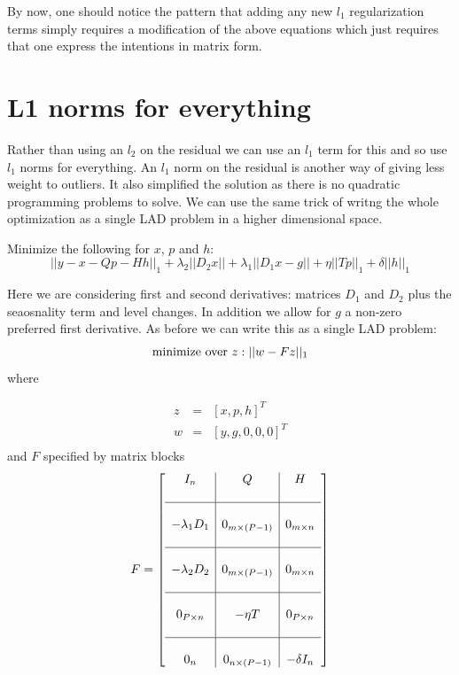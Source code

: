 \documentclass{article}
\begin{document}
By now, one should notice the pattern that adding any new $l_1$ regularization
terms simply requires a modification of the above equations which just requires
that one express the intentions in matrix form.

\section{L1 norms for everything}

Rather than using an $l_2$ on the residual we can use an $l_1$ term for this and so use
$l_1$ norms for everything. An $l_1$ norm on the residual is another way of giving less
weight to outliers. It also simplified the solution as there is no quadratic programming
problems to solve. We can use the same trick of writng the whole optimization as a single
LAD problem in a higher dimensional space.

Minimize the following for $x$, $p$ and $h$:
\begin{equation}
||y - x - Q p -H h||_1 + \lambda_2 ||D_2 x|| + \lambda_1 ||D_1 x - g||
+ \eta ||T p||_1 + \delta ||h||_1
\end{equation}

Here we are considering first and second derivatives: matrices $D_1$ and $D_2$ plus the seaosnality
term and level changes. In addition we allow for $g$ a non-zero preferred first derivative. As before
we can write this as a single LAD problem:
\[
\mbox{minimize over}~ z :  ||w-F z||_1 \\
\]
where

\begin{eqnarray}
z & = & [x, p , h]^T\\
w & = & [y, g, 0, 0, 0]^T \\
\end{eqnarray}
and $F$ specified by matrix blocks
\begin{equation}
F=\left[
\begin{array}{c|c|c}
I_n  & Q  & H \\
&\\
\hline
&\\
-\lambda_1 D_1 & 0_{m \times (P-1)} & 0_{m \times n}\\
&\\
\hline
&\\
-\lambda_2 D_2 & 0_{m \times (P-1)} & 0_{m \times n}\\
&\\
\hline
&\\
0_{P \times n} & -\eta T & 0_{P \times n} \\
&\\
\hline
&\\
0_{n} & 0_{n \times (P-1)} & -\delta I_n
\end{array}\right]
\end{equation}
\end{document}
